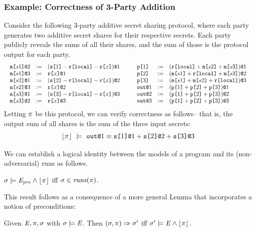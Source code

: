 \subsubsection{Example: Correctness of 3-Party Addition}
\label{section-smt-example}
Consider the following 3-party additive secret sharing protocol, where
each party generates two additive secret shares
\cite{evans2018pragmatic} for their respective secrets. Each party
publicly reveals the sums of all their shares, and the sum of those is
the protocol output for each party.  
$$
\begin{array}{c@{\qquad}c}
\begin{array}{lll}
  \elab{\mesg{s1}}{2} &:=& \elab{(\secret{1} \fminus \locflip \fminus \flip{x})}{1} \\ 
  \elab{\mesg{s1}}{3} &:=& \elab{\flip{x}}{1} \\ 
  \elab{\mesg{s2}}{1} &:=& \elab{(\secret{2} \fminus \locflip \fminus \flip{x})}{2} \\ 
  \elab{\mesg{s2}}{3} &:=& \elab{\flip{x}}{2} \\ 
  \elab{\mesg{s3}}{1} &:=& \elab{(\secret{3} \fminus \locflip \fminus \flip{x})}{3} \\ 
  \elab{\mesg{s3}}{2} &:=& \elab{\flip{x}}{3}
\end{array} & 
\begin{array}{lll}
  \rvl{1} &:=& \elab{(\locflip \fplus \mesg{s2} \fplus \mesg{s3})}{1} \\ 
  \rvl{2} &:=& \elab{(\mesg{s1} \fplus \locflip \fplus \mesg{s3})}{2} \\
  \rvl{3} &:=& \elab{(\mesg{s1} \fplus \mesg{s2} \fplus \locflip)}{3} \\
  \out{1} &:=& \elab{(\rvl{1} \fplus \rvl{2} + \rvl{3})}{1}\\
  \out{2} &:=& \elab{(\rvl{1} \fplus \rvl{2} + \rvl{3})}{2}\\
  \out{3} &:=& \elab{(\rvl{1} \fplus \rvl{2} + \rvl{3})}{3}
\end{array}
\end{array}
$$
Letting $\pi$ be this protocol, we can verify correctness
as follows-- that is, the output sum of all shares is the sum of the
three input secrets:
$$
\lfloor \pi \rfloor\ \models\ \texttt{out}\texttt{@}1 \equiv \texttt{s[}1\texttt{]}\texttt{@}1 + \texttt{s[}2\texttt{]}\texttt{@}2 + \texttt{s[}3\texttt{]}\texttt{@}3
$$

\noindent We can establish a logical identity between the models of a program and
its (non-adversarial) runs as follows.   
\begin{theorem}
  \label{theorem-toeq}
  $\sigma \models \mathit{E}_{\mathit{pre}} \wedge \lfloor \pi \rfloor$ iff $\sigma \in \mathit{runs}(\pi)$.
\end{theorem}
\noindent This result follows as a consequence of a more general Lemma
that incorporates a notion of preconditions:
\begin{lemma}
  \label{lemma-toeq}
  Given $\mathit{E}, \pi, \sigma$ with $\sigma \models \mathit{E}$.
  Then $(\sigma,\pi) \Rightarrow \sigma'$ iff $\sigma' \models
  \mathit{E} \wedge \lfloor \pi \rfloor$.
\end{lemma}

